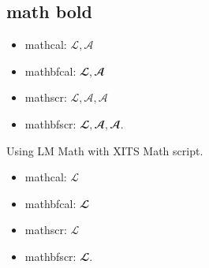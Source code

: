 \documentclass[version=last, pagesize, twoside=off, bibliography=totoc, 14pt, a4paper, french, english]{scrartcl}
\begin{document}
\subsection{math bold}
\begin{itemize}
	\item mathcal: $\mathcal{L}, \mathcal{A}$
	\item mathbfcal: $\mathbfcal{L}, \mathbfcal{A}$ 
	\item mathscr: $\mathscr{L}, \mathscr{A}, 𝒜$
	\item mathbfscr: $\mathbfscr{L}, \mathbfscr{A}, 𝓐$.
\end{itemize}

Using LM Math with XITS Math script.
\begin{itemize}
	\item mathcal: $\mathcal{L}$
	\item mathbfcal: $\mathbfcal{L}$ 
	\item mathscr: $\mathscr{L}$
	\item mathbfscr: $\mathbfscr{L}$.
\end{itemize}

%
\end{document}
